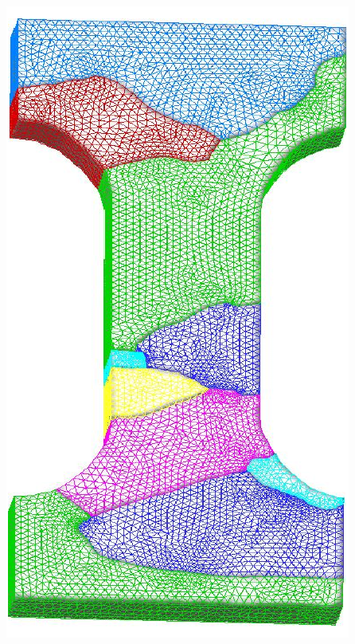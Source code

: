 \begin{frame}[fragile]
\begin{minipage}{.17\linewidth}
    \includegraphics[scale=0.3]{figures/mesh-dogbone.pdf}
  \end{minipage} 
%
\end{frame}

